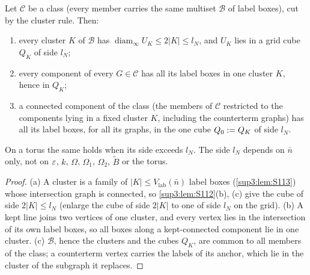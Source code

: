\begin{corollary}\label{sup3:cor:S114}
Let $\mathcal C$ be a class (every member carries the same multiset $\mathcal B$ of label boxes), cut by the cluster rule. Then:
\begin{enumerate}[label=\textup{(\alph*)},nosep,leftmargin=*]
\item every cluster $K$ of $\mathcal B$ has $\operatorname{diam}_\infty U_K\le2|K|\le l_N$, and $U_K$ lies in a grid cube $Q_K$ of side $l_N$;
\item every component of every $G\in\mathcal C$ has all its label boxes in one cluster $K$, hence in $Q_K$;
\item a connected component of the class (the members of $\mathcal C$ restricted to the components lying in a fixed cluster $K$, including the counterterm graphs) has all its label boxes, for all its graphs, in the one cube $Q_0:= Q_K$ of side $l_N$.
\end{enumerate}
On a torus the same holds when its side exceeds $l_N$. The side $l_N$ depends on $\bar n$ only, not on $\varepsilon$, $k$, $\Omega$, $\Omega_1$, $\Omega_2$, $\tilde B$ or the torus.
\end{corollary}

\begin{proof}
(a) A cluster is a family of $|K|\le V_{\mathrm{lab}}(\bar n)$ label boxes (\cref{sup3:lem:S113}) whose intersection graph is connected, so \cref{sup3:lem:S112}(b), (c) give the cube of side $2|K|\le l_N$ (enlarge the cube of side $2|K|$ to one of side $l_N$ on the grid). (b) A kept line joins two vertices of one cluster, and every vertex lies in the intersection of its own label boxes, so all boxes along a kept-connected component lie in one cluster. (c) $\mathcal B$, hence the clusters and the cubes $Q_K$, are common to all members of the class; a counterterm vertex carries the labels of its anchor, which lie in the cluster of the subgraph it replaces.
\end{proof}

